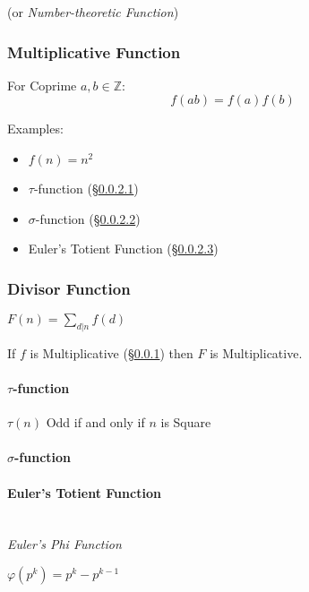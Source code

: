 (or \emph{Number-theoretic Function})



\subsubsection{Multiplicative Function}
\label{sec:multiplicative_function}

For Coprime $a,b \in \mathbb{Z}$:
\[
  f(ab) = f(a)f(b)
\]

Examples:
\begin{itemize}
  \item $f(n) = n^2$
  \item $\tau$-function (\S\ref{sec:tau_function})
  \item $\sigma$-function (\S\ref{sec:sigma_function})
  \item Euler's Totient Function (\S\ref{sec:eulers_totient})
\end{itemize}



\subsubsection{Divisor Function}\label{sec:divisor_function}

$F(n) = \sum_{d|n}f(d)$

If $f$ is Multiplicative (\S\ref{sec:multiplicative_function}) then
$F$ is Multiplicative.



\paragraph{$\tau$-function}\label{sec:tau_function}

$\tau(n)$ Odd if and only if $n$ is Square



\paragraph{$\sigma$-function}\label{sec:sigma_function}

\paragraph{Euler's Totient Function}\label{sec:eulers_totient}
\hfill \\

\emph{Euler's Phi Function}

$\varphi(p^k) = p^k - p^{k-1}$

